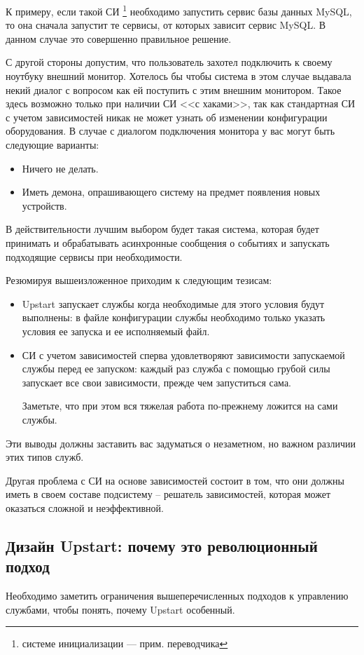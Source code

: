 К примеру, если такой СИ \footnote{системе инициализации --- прим. переводчика} необходимо запустить сервис базы данных MySQL, то она сначала запустит те сервисы, от которых зависит сервис MySQL. В данном случае это совершенно правильное решение.

С другой стороны допустим, что пользователь захотел подключить к своему ноутбуку внешний монитор. Хотелось бы чтобы система в этом случае выдавала некий диалог с вопросом как ей поступить с этим внешним монитором. Такое здесь возможно только при наличии СИ <<с хаками>>, так как стандартная СИ с учетом зависимостей никак не может узнать об изменении конфигурации оборудования. В случае с диалогом подключения монитора у вас могут быть следующие варианты: \begin{itemize}
\item Ничего не делать.
\item Иметь демона, опрашивающего систему на предмет появления новых устройств.
\end{itemize} 
В действительности лучшим выбором будет такая система, которая будет принимать и обрабатывать асинхронные сообщения о событиях и запускать подходящие сервисы при необходимости.

Резюмируя вышеизложенное приходим к следующим тезисам: \begin{itemize}
\item Upstart запускает службы когда необходимые для этого условия будут выполнены: в файле конфигурации службы необходимо только указать условия ее запуска и ее исполняемый файл.
\item СИ с учетом зависимостей сперва удовлетворяют зависимости запускаемой службы перед ее запуском: каждый раз служба с помощью грубой силы запускает все свои зависимости, прежде чем запуститься сама.

Заметьте, что при этом вся тяжелая работа по-прежнему ложится на сами службы.
\end{itemize}
Эти выводы должны заставить вас задуматься о незаметном, но важном различии этих типов служб.

Другая проблема с СИ на основе зависимостей состоит в том, что они должны иметь в своем составе подсистему -- решатель зависимостей, которая может оказаться сложной и неэффективной.
\subsection{Дизайн Upstart: почему это революционный подход}
Необходимо заметить ограничения вышеперечисленных подходов к управлению службами, чтобы понять, почему Upstart особенный.

